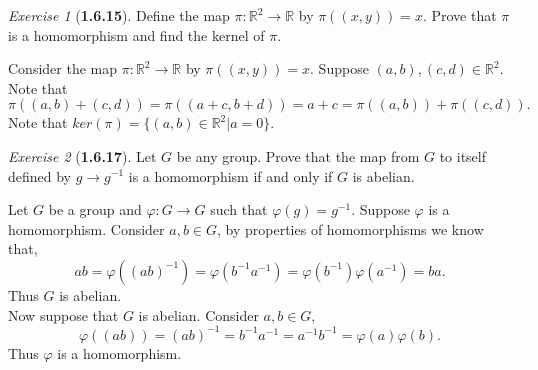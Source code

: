 \documentclass[12pt]{amsart}
\makeatletter
\theoremstyle{remark}
\newtheorem*{exercise}{Exercise}%
\def\RR{\ensuremath{\mathbb R}} %
\renewenvironment{proof}[1][\proofname]{\par\doublespacing
  \pushQED{\qed}%
  \normalfont \topsep6\p@\@plus6\p@\relax
  \list{}{%
    \settowidth{\leftmargin}{\itshape\proofname:\hskip\labelsep}%
    \setlength{\labelwidth}{0pt}%
    \setlength{\itemindent}{-\leftmargin}%
  }%
  \item[\hskip\labelsep\itshape#1\@addpunct{:}]\ignorespaces
}{%
  \popQED\endlist\@endpefalse
  \singlespacing
}
\theoremstyle{mycomment}
\makeatother
\begin{document}
\begin{exercise}[\textbf{1.6.15}] Define the map $\pi: \RR^2 \to \RR$ by $\pi((x,y)) = x$. Prove that $\pi$ is a homomorphism and find the kernel of $\pi$. 
  \begin{proof} Consider the map $\pi: \RR^2 \to \RR$ by $\pi((x,y)) = x$. Suppose $(a, b),(c, d) \in \RR^2$. Note that 
    \begin{equation*}
      \pi((a, b) + (c, d)) = \pi((a + c, b + d)) = a + c = \pi((a, b)) + \pi((c, d)).
    \end{equation*}
    Note that $ker(\pi) = \{(a, b)\in \RR^2 | a = 0\}$.
  \end{proof}
\end{exercise}
\vspace{.15in}



\begin{exercise}[\textbf{1.6.17}] Let $G$ be any group. Prove that the map from $G$ to itself defined by $g \to g^{-1}$
  is a homomorphism if and only if $G$ is abelian.
  \begin{proof} Let $G$ be a group and $\varphi: G \to G$ such that $\varphi(g) = g^{-1}$. Suppose $\varphi$ is a homomorphism. Consider $a,b \in G$, by properties 
    of homomorphisms we know that, 
    \begin{equation*}
      ab = \varphi((ab)^{-1}) = \varphi(b^{-1}a^{-1}) = \varphi(b^{-1})\varphi(a^{-1}) = ba.  
    \end{equation*}
    Thus $G$ is abelian.\\

    Now suppose that $G$ is abelian. Consider $a,b \in G$,
    \begin{equation*}
      \varphi((ab)) = (ab)^{-1} = b^{-1}a^{-1} = a^{-1}b^{-1} = \varphi(a)\varphi(b). 
    \end{equation*}
    Thus $\varphi$ is a homomorphism.
  \end{proof}
\end{exercise}
\vspace{.15in}
\end{document}
